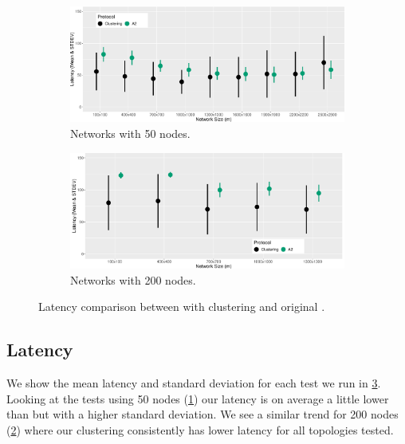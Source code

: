 \begin{figure}[bt]
    \centering
    \begin{subfigure}{0.7\textwidth}
        \centering
        \includegraphics[width=\textwidth]{figure/Results/ChaosComparison/ChaosComparison_50_Latency.pdf}
        \caption{Networks with 50 nodes.}
        \label{subfig:latency-50-nodes}
    \end{subfigure}
    \hfill
    \begin{subfigure}{0.7\textwidth}
        \centering
        \includegraphics[width=\textwidth]{figure/Results/ChaosComparison/ChaosComparison_200_Latency.pdf}
        \caption{Networks with 200 nodes.}
        \label{subfig:latency-200-nodes}
    \end{subfigure}
    \caption{Latency comparison between \atwo{} with clustering and original \atwo{}.}
    \label{fig:latency-results}
\end{figure}

\subsection{Latency}
We show the mean latency and standard deviation for each test we run in \cref{fig:latency-results}. Looking at the tests using 50 nodes (\cref{subfig:latency-50-nodes}) our latency is on average a little lower than \atwo{} but with a higher standard deviation. We see a similar trend for 200 nodes (\cref{subfig:latency-200-nodes}) where our clustering consistently has lower latency for all topologies tested. 

